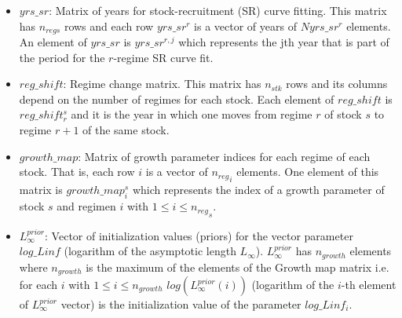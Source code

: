 \documentclass{article}
\begin{document}
\begin{itemize}
    \item $yrs\_sr$: Matrix of years for stock-recruitment (SR) curve fitting. This matrix has $n_{regs}$ rows and each row $yrs\_sr^{r}$ is a vector of years of $Nyrs\_sr^r$ elements. An element of $yrs\_sr$ is $yrs\_sr^{r,j}$ which represents the jth year that is part of the period for the $r$-regime SR curve fit.
    \item $reg\_shift$: Regime change matrix. This matrix has $n_{stk}$ rows and its columns depend on the number of regimes for each stock. Each element of $reg\_shift$ is $reg\_shift^s_r$ and it is the year in which one moves from regime $r$ of stock $s$ to regime $r+1$ of the same stock.
    
     \item $growth\_map$: Matrix of growth parameter indices for each regime of each stock. That is, each row $i$ is a vector of ${n_{reg}}_i$ elements. One element of this matrix is $growth\_map^s_i$ which represents the index of a growth parameter of stock $s$ and regimen $i$ with $1\leq i \leq {n_{reg}}_s$.
 
    \item $L_{\infty}^{prior}$: Vector of initialization values (priors) for the vector parameter $log\_Linf$ (logarithm of the asymptotic length $L_{\infty}$). $L_{\infty}^{prior}$ has $n_{growth}$ elements where $n_{growth}$ is the maximum of the elements of the Growth map matrix i.e. for each $i$ with $1\leq i \leq n_{growth}$ $log({L_{\infty}^{prior}}(i))$ (logarithm of the $i$-th element of $L_{\infty}^{prior}$ vector) is the initialization value of the parameter $log\_Linf_i$.
    

\end{itemize}
\end{document}
